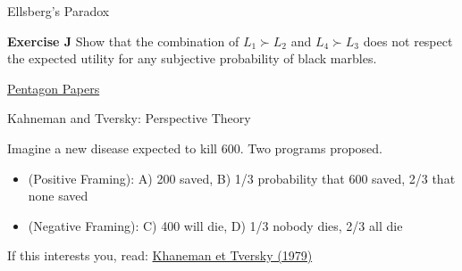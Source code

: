 \documentclass[handout]{beamer}
\begin{document}
\begin{frame}{Ellsberg's Paradox}

\textbf{Exercise J} Show that the combination of $L_1 \succ L_2$ and $L_4 \succ L_3$ does not respect the expected utility for any subjective probability of black marbles. 

\href{https://fr.wikipedia.org/wiki/Daniel_Ellsberg}{Pentagon Papers}

\end{frame}

\begin{frame}{Kahneman and Tversky: Perspective Theory}

Imagine a new disease expected to kill 600. Two programs proposed. 

\begin{itemize}
\item (Positive Framing): A) 200 saved, B) 1/3 probability that 600 saved, 2/3 that none saved
\item (Negative Framing): C) 400 will die, D) 1/3 nobody dies, 2/3 all die
	\end{itemize}


If this interests you, read: \href{https://www.uzh.ch/cmsssl/suz/dam/jcr:00000000-64a0-5b1c-0000-00003b7ec704/10.05-kahneman-tversky-79.pdf}{Khaneman et Tversky (1979)}

\end{frame}
\end{document}
